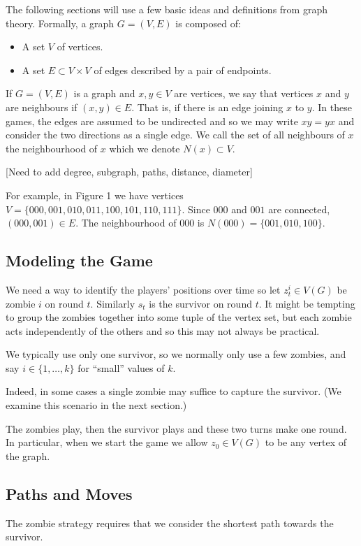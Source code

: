 
The following sections will use a few basic ideas and definitions from graph theory.
Formally, a graph $G = (V, E)$ is composed of:

\begin{itemize}
\item A set $V$ of vertices.
\item A set $E \subset V \times V$ of edges described by a pair of endpoints.
\end{itemize}

If $G = (V,E)$ is a graph and $x,y \in V$ are vertices, we say that vertices $x$ and $y$ are neighbours if $(x,y) \in E$.
That is, if there is an edge joining $x$ to $y$.
In these games, the edges are assumed to be undirected and so we may write $xy = yx$
and consider the two directions as a single edge.
We call the set of all neighbours of $x$ the neighbourhood of $x$ which we denote $N(x) \subset V$.

[Need to add degree, subgraph, paths,  distance, diameter]

For example, in Figure 1 we have vertices $V = \{ 000, 001, 010, 011, 100, 101, 110, 111 \}$.
Since $000$ and $001$ are connected, $(000, 001) \in E$.
The neighbourhood of $000$ is $N(000) = \{ 001, 010, 100 \}$.

\subsection{Modeling the Game}

We need a way to identify the players' positions over time so let
$z_t^i \in V(G)$ be zombie $i$ on round $t$. Similarly $s_t$ is the
survivor on round $t$. It might be tempting to group the zombies together
into some tuple of the vertex set, but each zombie acts independently of
the others and so this may not always be practical.

We typically use only one survivor, so we normally only use a few zombies, and
say $i \in \{1, \dots, k\}$ for ``small'' values of $k$.

Indeed, in some cases a single zombie may suffice
to capture the survivor. (We examine this scenario in the next section.)

The zombies play, then the survivor plays and these two turns make one round.
In particular, when we start the game we allow $z_0 \in V(G)$ to be
 any vertex of the graph.

\subsection{Paths and Moves}
The zombie strategy requires that we consider the shortest path towards the survivor.


